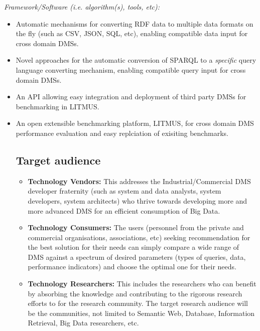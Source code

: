 \documentclass{llncs}
\newcommand{\todoproofread}[3]{
    \todoitemtemplate{#1}{#2}{Please proof read above section; #3}{inline}{yellow}
}
\newcommand{\todoitemtemplate}[5]{%
\todo[#4,color=#5,caption=X]{{#1}{ \textbf{{\tiny{for}} #2}:}{#3}}%
}
\begin{document}
         \textit{Framework/Software (i.e. algorithm(s), tools, etc):} 
        \begin{itemize}[nosep]
            \item Automatic mechanisms for converting RDF data to multiple data formats on the fly (such as CSV, JSON, SQL, etc), enabling compatible data input for cross domain DMSs. 
            \item Novel approaches for the automatic conversion of SPARQL to a \textit{specific} query language converting mechanism, enabling compatible query input for cross domain DMSs.
            \item An API allowing easy integration and deployment of third party DMSs for benchmarking in LITMUS.
            \item An open extensible benchmarking platform, LITMUS, for cross domain DMS performance evaluation and easy replciation of exisiting benchmarks.

    \subsection{Target audience}
        \begin{itemize}[nosep]
            \item \textbf{Technology Vendors:}
            This addresses the Industrial/Commercial DMS developer fraternity (such as system and data analysts, system developers, system architects) who thrive towards developing more and more advanced DMS for an efficient consumption of Big Data.
            \item \textbf{Technology Consumers:}
            The users (personnel from the private and commercial organisations, associations, etc) seeking recommendation for the best solution for their needs can simply compare a wide range of DMS against a spectrum of desired parameters (types of queries, data, performance indicators) and choose the optimal one for their needs. 
            \item \textbf{Technology Researchers:}
            This includes the researchers who can benefit by absorbing the knowledge and contributing to the rigorous research efforts to for the research community. The target research audience will be the communities, not limited to Semantic Web, Database, Information Retrieval, Big Data researchers, etc.
        \end{itemize}



\end{itemize}
\end{document}
